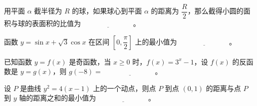 \begin{question}
用平面 $\alpha$ 截半径为 $R$ 的球，如果球心到平面 $\alpha$ 的距离为 $\dfrac{R}{2}$，那么截得小圆的面积与球的表面积的比值为 $\underline{\hspace{3cm}}$。

\end{question}
\begin{question}
函数 $y=\sin x+\sqrt{3}\cos x$ 在区间 $\left[0,\dfrac{\pi}{2}\right]$ 上的最小值为 $\underline{\hspace{3cm}}$。

\end{question}
\begin{question}
已知函数 $y=f(x)$ 是奇函数，当 $x\geqslant 0$ 时，$f(x)=3^x-1$，设 $f(x)$ 的反函数是 $y=g(x)$，则 $g(-8)=$ $\underline{\hspace{3cm}}$。

\end{question}
\begin{question}
设 $P$ 是曲线 $y^2=4(x-1)$ 上的一个动点，则点 $P$ 到点 $(0,1)$ 的距离与点 $P$ 到 $y$ 轴的距离之和的最小值为 $\underline{\hspace{3cm}}$。

\end{question}

